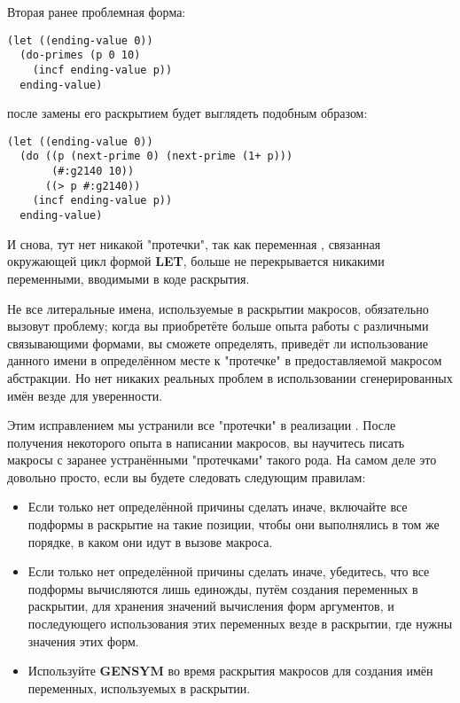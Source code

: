 Вторая ранее проблемная форма:

\begin{lstlisting}
(let ((ending-value 0))
  (do-primes (p 0 10)
    (incf ending-value p))
  ending-value)
\end{lstlisting}

после замены  его раскрытием будет выглядеть подобным образом:

\begin{lstlisting}
(let ((ending-value 0))
  (do ((p (next-prime 0) (next-prime (1+ p)))
       (#:g2140 10))
      ((> p #:g2140))
    (incf ending-value p))
  ending-value)
\end{lstlisting}

И снова, тут нет никакой "протечки", так как переменная , связанная
окружающей цикл  формой \textbf{LET}, больше не перекрывается никакими
переменными, вводимыми в коде раскрытия.

Не все литеральные имена, используемые в раскрытии макросов, обязательно вызовут проблему;
когда вы приобретёте больше опыта работы с различными связывающими формами, вы сможете
определять, приведёт ли использование данного имени в определённом месте к "протечке" в
предоставляемой макросом абстракции. Но нет никаких реальных проблем в использовании
сгенерированных имён везде для уверенности.

Этим исправлением мы устранили все "протечки" в реализации . После
получения некоторого опыта в написании макросов, вы научитесь писать макросы с заранее
устранёнными "протечками" такого рода. На самом деле это довольно просто, если вы будете
следовать следующим правилам:
\begin{itemize}
\item Если только нет определённой причины сделать иначе, включайте все подформы в
  раскрытие на такие позиции, чтобы они выполнялись в том же порядке, в каком они идут в
  вызове макроса.
\item Если только нет определённой причины сделать иначе, убедитесь, что все подформы
  вычисляются лишь единожды, путём создания переменных в раскрытии, для хранения значений
  вычисления форм аргументов, и последующего использования этих переменных везде в
  раскрытии, где нужны значения этих форм.
\item Используйте \textbf{GENSYM} во время раскрытия макросов для создания имён
  переменных, используемых в раскрытии.
\end{itemize}

